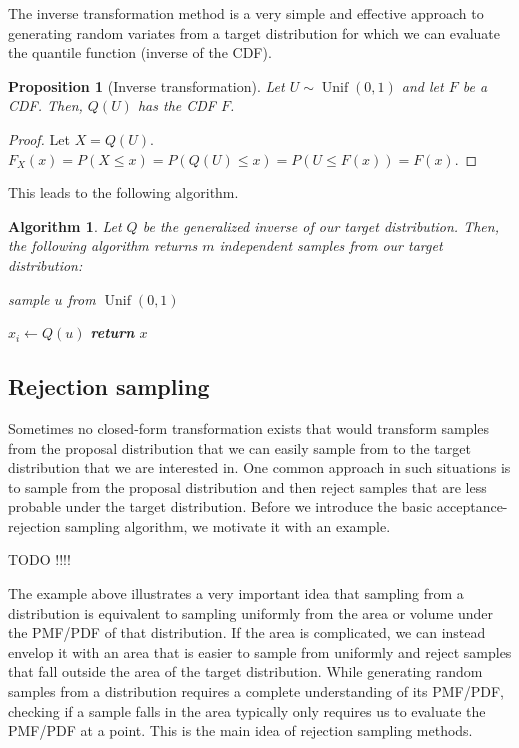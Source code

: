 \documentclass{book}
\theoremstyle{plain}%
\newtheorem{prototheorem}{Example}[section]
\newenvironment{cexample}
   {\colorlet{shadecolor}{gray!10}\begin{shaded}\begin{prototheorem}}
   {\end{prototheorem}\end{shaded}}
\newtheorem{proposition}{Proposition}[section]
\newtheorem{algo}{Algorithm}[section]
\theoremstyle{definition}
\DeclareMathOperator{\Unif}{Unif}
\begin{document}
The inverse transformation method is a very simple and effective approach to generating random variates from a target distribution for which we can evaluate the quantile function (inverse of the CDF).

\begin{proposition}[Inverse transformation]
Let $U \sim \Unif(0,1)$ and let $F$ be a CDF. Then, $Q(U)$ has the CDF $F$.
\end{proposition}

\begin{proof}
Let $X = Q(U)$. $F_X(x) = P(X \leq x) = P(Q(U) \leq x) = P(U \leq F(x)) = F(x)$.
\end{proof}

This leads to the following algorithm.

\begin{algo}
Let $Q$ be the generalized inverse of our target distribution. Then, the following algorithm returns $m$ independent samples from our target distribution:
\begin{algorithmic}[1]
 
\State sample $u$ from $\Unif(0,1)$

                \State $x_i \gets Q(u)$
              \EndFor
              \State \textbf{return} $x$
        \EndProcedure
    \end{algorithmic}
\end{algo}


\subsection*{Rejection sampling}

Sometimes no closed-form transformation exists that would transform samples from the proposal distribution that we can easily sample from to the target distribution that we are interested in. One common approach in such situations is to sample from the proposal distribution and then reject samples that are less probable under the target distribution. Before we introduce the basic acceptance-rejection sampling algorithm, we motivate it with an example.

TODO !!!!

The example above illustrates a very important idea that sampling from a distribution is equivalent to sampling uniformly from the area or volume under the PMF/PDF of that distribution. If the area is complicated, we can instead envelop it with an area that is easier to sample from uniformly and reject samples that fall outside the area of the target distribution. While generating random samples from a distribution requires a complete understanding of its PMF/PDF, checking if a sample falls in the area typically only requires us to evaluate the PMF/PDF at a point. This is the main idea of rejection sampling methods.
\end{document}
